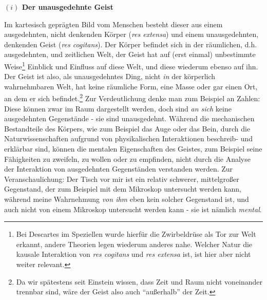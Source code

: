 \documentclass[a4paper, 12pt]{article}
\begin{document}
\begin{onehalfspace}

\vspace{5mm}
\noindent\textbf{$(i)$ Der unausgedehnte Geist}


\noindent Im kartesisch geprägten Bild vom Menschen besteht dieser aus einem ausgedehnten, nicht denkenden Körper (\emph{res extensa}) und einem unausgedehnten, denkenden Geist (\emph{res cogitans}). Der Körper befindet sich in der räumlichen, d.h. ausgedehnten, und zeitlichen Welt, der Geist hat auf (erst einmal) unbestimmte Weise\footnote{Bei Descartes im Speziellen wurde hierfür die Zwirbeldrüse als Tor zur Welt erkannt, andere Theorien legen wiederum anderes nahe. Welcher Natur die kausale Interaktion von \emph{res cogitans} und \emph{res extensa} ist, ist hier aber nicht weiter relevant.} Einblick und Einfluss auf diese Welt, und diese wiederum ebenso auf ihn. Der Geist ist also, als unausgedehntes Ding, nicht \emph{in} der körperlich wahrnehmbaren Welt, hat keine räumliche Form, eine Masse oder gar einen Ort, an dem er sich befindet.\footnote{Da wir spätestens seit Einstein wissen, dass Zeit und Raum nicht voneinander trennbar sind, wäre der Geist also auch "`außerhalb"' der Zeit.} Zur Verdeutlichung denke man zum Beispiel an Zahlen: Diese können zwar im Raum dargestellt werden, doch sind \emph{an sich} keine ausgedehnten Gegenstände - sie sind unausgedehnt. Während die mechanischen Bestandteile des Körpers, wie zum Beispiel das Auge oder das Bein, durch die Naturwissenschaften aufgrund von physikalischen Interaktionen beschreib- und erklärbar sind, können die mentalen Eigenschaften des Geistes, zum Beispiel seine Fähigkeiten zu zweifeln, zu wollen oder zu empfinden, nicht durch die Analyse der Interaktion von ausgedehnten Gegenständen verstanden werden. Zur Veranschaulichung: Der Tisch vor mir ist ein relativ schwerer, mittelgroßer Gegenstand, der zum Beispiel mit dem Mikroskop untersucht werden kann, während meine Wahrnehmung \emph{von ihm} eben kein solcher Gegenstand ist, und auch nicht von einem Mikroskop untersucht werden kann - sie ist nämlich \emph{mental}. 


\end{onehalfspace}
\end{document}
